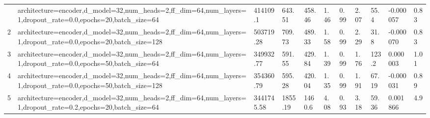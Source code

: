 \begin{longtable}{C{0.8cm} L{2cm} C{1.15cm} C{1.15cm} C{1.15cm} C{1.15cm} C{0.85cm} C{1.25cm} C{1.2cm} C{1.5cm} C{1.0cm}}
\bottomrule
{} & architecture=encoder,\newline d\_model=32,\newline num\_heads=2,\newline ff\_dim=64,\newline num\_layers=1,\newline dropout\_rate=0.0,\newline epochs=20,\newline batch\_size=64 & 414109.1 & 643.51 & 458.46 & 1.46 & 0.99 & 2.07 & 55.4 & -0.000057 & 0.83 \\
2 & architecture=encoder,\newline d\_model=32,\newline num\_heads=2,\newline ff\_dim=64,\newline num\_layers=1,\newline dropout\_rate=0.0,\newline epochs=20,\newline batch\_size=128 & 503719.28 & 709.73 & 489.33 & 1.58 & 0.99 & 2.29 & 31.8 & -0.000070 & 0.83 \\
3 & architecture=encoder,\newline d\_model=32,\newline num\_heads=2,\newline ff\_dim=64,\newline num\_layers=1,\newline dropout\_rate=0.0,\newline epochs=50,\newline batch\_size=64 & 349932.77 & 591.55 & 429.84 & 1.39 & 0.99 & 1.76 & 123.2 & 0.000003 & 1.01 \\
4 & architecture=encoder,\newline d\_model=32,\newline num\_heads=2,\newline ff\_dim=64,\newline num\_layers=1,\newline dropout\_rate=0.0,\newline epochs=50,\newline batch\_size=128 & 354360.79 & 595.28 & 420.04 & 1.35 & 0.99 & 1.91 & 67.19 & -0.000031 & 0.89 \\
5 & architecture=encoder,\newline d\_model=32,\newline num\_heads=2,\newline ff\_dim=64,\newline num\_layers=1,\newline dropout\_rate=0.2,\newline epochs=20,\newline batch\_size=64 & 3441745.58 & 1855.19 & 1460.6 & 4.08 & 0.93 & 3.18 & 59.36 & 0.001866 & 4.9 \\

\end{longtable}
